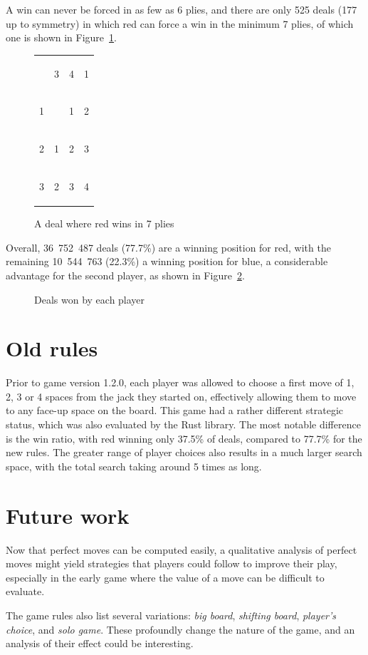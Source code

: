 \documentclass[a4paper, twocolumn]{article}
\newcommand\card[1]{\begin{tcolorbox}#1\end{tcolorbox}}
\newcommand\redpawn{{\LARGE{\textcolor{red}{\usym{2659}}}}}
\newcommand\bluepawn{{\LARGE{\textcolor{blue}{\usym{2659}}}}}
\newcommand\board[8]{
  \setlength{\tabcolsep}{0.1cm}
  \begin{tabular}{c c c c}
    \card{#1} & \card{#2} & \card{#3} & \card{#4} \\
    \card{#5} & \card{#6} & \card{#7} & \card{#8} \\
    \boardmore
}
\newcommand\boardmore[8]{
    \card{#1} & \card{#2} & \card{#3} & \card{#4} \\
    \card{#5} & \card{#6} & \card{#7} & \card{#8}
  \end{tabular}
}
\begin{document}
A win can never be forced in as few as 6 plies, and there are only 525 deals (177
up to symmetry) in which red can force a win in the minimum 7 plies, of which
one is shown in Figure~\ref{fig:win-in-7}.

\begin{figure}[ht]
  \centering
  \board {\redpawn}341 1{\bluepawn}12 2123 3234
  \caption{A deal where red wins in 7 plies}
  \label{fig:win-in-7}
\end{figure}

Overall, 36~752~487 deals (77.7\%) are a winning position for red, with the
remaining 10~544~763 (22.3\%) a winning position for blue, a considerable
advantage for the second player, as shown in Figure~\ref{fig:win-chance}.

\begin{figure}[ht]
  \centering
  \caption{Deals won by each player}
  \label{fig:win-chance}
\end{figure}


\section{Old rules}

Prior to game version 1.2.0, each player was allowed to choose a first move of
1, 2, 3 or 4 spaces from the jack they started on, effectively allowing them to
move to any face-up space on the board. This game had a rather different
strategic status, which was also evaluated by the Rust library. The most notable
difference is the win ratio, with red winning only 37.5\% of deals, compared to
77.7\% for the new rules. The greater range of player choices also results in a
much larger search space, with the total search taking around 5 times as long.


\section{Future work}

Now that perfect moves can be computed easily, a qualitative analysis of perfect
moves might yield strategies that players could follow to improve their play,
especially in the early game where the value of a move can be difficult to
evaluate.

The game rules \cite{rules} also list several variations: \textit{big board},
\textit{shifting board}, \textit{player's choice}, and \textit{solo game}.
These profoundly change the nature of the game, and an analysis of their effect
could be interesting.
\end{document}
